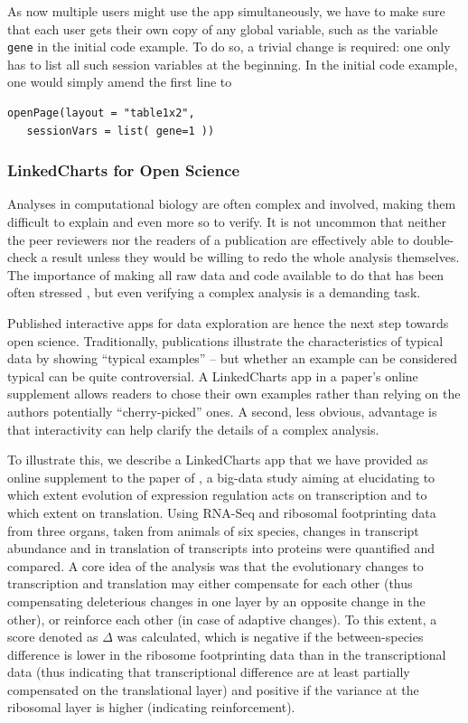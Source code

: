 \documentclass[twocolumn,10pt]{article}
\begin{document}
As now multiple users might use the app simultaneously, we have to make sure that each user gets their own copy of any global variable, such as the variable \texttt{gene} in the initial code example. To do so, a trivial change is required: one only has to list all such session variables at the beginning. In the initial code example, one would simply amend the first line to 
\begin{verbatim}
openPage(layout = "table1x2", 
   sessionVars = list( gene=1 ))
\end{verbatim}


\subsubsection{LinkedCharts for Open Science}

Analyses in computational biology are often complex and involved, making them difficult to explain and even more so to verify. It is not uncommon that neither the peer reviewers nor the readers of a publication are effectively able to double-check a result unless they would be willing to redo the whole analysis themselves. The importance of making all raw data and code available to do that has been often stressed \citep{gentleman_2005}, but even verifying a complex analysis is a demanding task.

Published interactive apps for data exploration are hence the next step towards open science. Traditionally, publications illustrate the characteristics of typical data by showing ``typical examples'' -- but whether an example can be considered typical can be quite controversial. A LinkedCharts app in a paper's online supplement allows readers to chose their own examples rather than relying on the authors potentially ``cherry-picked'' ones. A second, less obvious, advantage is that interactivity can help clarify the details of a complex analysis.

To illustrate this, we describe a LinkedCharts app that we have provided as online supplement to the paper of \citet{wang_2020}, a big-data study aiming at elucidating to which extent evolution of expression regulation acts on transcription and to which extent on translation. Using RNA-Seq and ribosomal footprinting data from three organs, taken from animals of six species, changes in transcript abundance and in translation of transcripts into proteins were quantified and compared. A core idea of the analysis was that the evolutionary changes to transcription and translation may either compensate for each other  (thus compensating deleterious changes in one layer by an opposite change in the other), or reinforce each other (in case of adaptive changes). To this extent, a score denoted as $\Delta$ was calculated, which is negative if the between-species difference is lower in the ribosome footprinting data than in the transcriptional data (thus indicating that transcriptional difference are at least partially compensated on the translational layer) and positive if the variance at the ribosomal layer is higher (indicating reinforcement).
\end{document}
